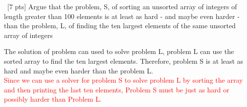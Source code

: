 \documentclass[12pt]{article}
\newenvironment{sol}[1][Solution]{\begin{trivlist}\item[\hskip\labelsep {\bfseries #1:}]}{\end{trivlist}}
\begin{document}
\begin{enumerate}
    \item \ [7 pts] Argue that the problem, S, of sorting an unsorted array of integers of length greater than 100 elements is at least as hard - and maybe even harder - than the problem, L, of finding the ten largest elements of the same unsorted array of integers
    \begin{sol}
    The solution of problem can used to solve problem L, problem L can use the sorted array to find the ten largest elements. Therefore, problem S is at least as hard and maybe even harder than the problem L.\\
    \textcolor{red}{Since we can use a solver for problem S to solve problem L by sorting the array and then printing the last ten elements, Problem S must be just as hard or possibly harder than Problem L.}
    \end{sol}


\end{enumerate}
\end{document}
